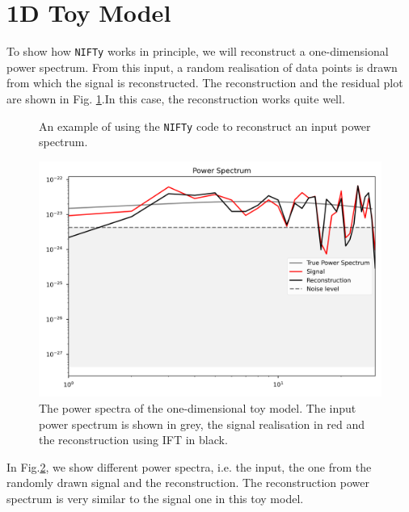 \section{1D Toy Model}

To show how {\tt NIFTy} works in principle, we will reconstruct a one-dimensional power spectrum. From this input, a random realisation of data points is drawn from which the signal is reconstructed. The reconstruction and the residual plot are shown in Fig. \ref{1D_reconstruction}.In this case, the reconstruction works quite well. 

\begin{figure}[h]
    \centering
    \caption{An example of using the {\tt NIFTy} code to reconstruct an input power spectrum.}
    \label{1D_reconstruction}
\end{figure}

\begin{figure}[h]
    \centering
    \includegraphics[width=0.7\linewidth]{Images/power_spectrum_400Hz_1D.png}
    \caption[The power spectra of the one-dimensional toy model.]{The power spectra of the one-dimensional toy model. The input power spectrum is shown in grey, the signal realisation in red and the reconstruction using IFT in black.}
    \label{1D_power_spectrum}
\end{figure} 

In Fig.\ref{1D_power_spectrum}, we show different power spectra, i.e. the input, the one from the randomly drawn signal and the reconstruction. The reconstruction power spectrum is very similar to the signal one in this toy model.
